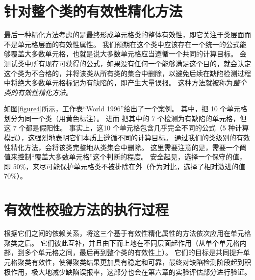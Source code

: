 \section{针对整个类的有效性精化方法}

最后一种精化方法考虑的是最终形成单元格类的整体有效性，即它关注于类层面而不是单元格层面的有效性属性。
我们预期在这个类中应该存在一个统一的公式能够覆盖大多数单元格，也就是说大多数单元格应当遵循一个共同的计算目标。
\wa 会测试类中所有现存可获得的公式，如果没有任何一个能够满足这个目的，\wa 就会认定这个类为不合格的，并将该类从所有类的集合中删除，以避免后续在缺陷检测过程中将绝大多数单元格标记为有缺陷的，即产生大量误报。
这种方法就被称为\textit{整个类的有效性精化方法}。

如图\ref{figure4}所示，工作表“World 1996”给出了一个案例。
其中，\cu 把 10 个单元格划分为同一个类（用黄色标注）。
进而 \cu 把其中的 7 个检测为有缺陷的单元格，但这 7 个都是假阳性。
事实上，这10 个单元格包含几乎完全不同的公式（5 种计算模式），这强烈地表明它们本质上遵循不同的计算目标。
通过我们的类级别的有效性精化方法，\wa 会将该类完整地从类集合中删除。
这里需要注意的是，\wa 需要一个阈值来控制“覆盖大多数单元格”这个判断的程度。
安全起见，\wa 选择一个保守的值，即 50\%，来尽可能保护单元格类不被排除在外（作为对比，\ca 选择了相对激进的值70\%）。


\section{有效性校验方法的执行过程}
根据它们之间的依赖关系，\wa 将这三个基于有效性精化属性的方法依次应用在单元格聚类之后。
它们彼此互补，并且由下而上地在不同层面起作用（从单个单元格内部，到多个单元格之间，最后再到整个类的有效性上）。
它们的目标是共同提升单元格聚类有效性，使得聚类结果更加具有稳定和可靠，最终对缺陷检测阶段起到积极作用，极大地减少缺陷误报率，这部分也会在第六章的实验评估部分进行验证。